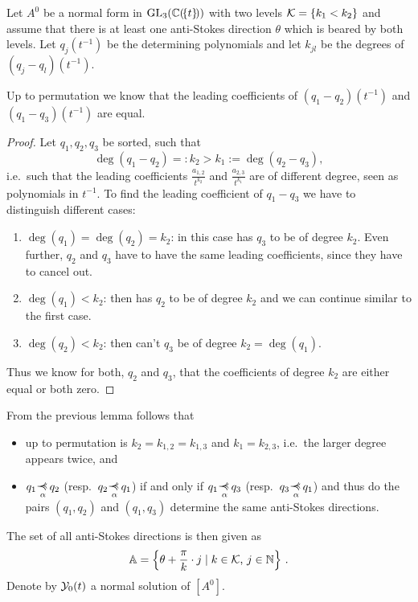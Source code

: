 Let $A^0$ be a normal form in $\operatorname{GL}_3(\mathbb{C}(\!\{t\}\!))$ with two levels
$\mathcal{K}=\{k_1<k_2\}$ and assume that there is at least one anti-Stokes
direction $\theta$ which is beared by both levels.
Let $q_j(t^{-1})$ be the determining polynomials and let $k_{jl}$ be the
degrees of $(q_j-q_l)(t^{-1})$.
\begin{lem}\label{lem:simpleLemmaOnStructure}
  Up to permutation we know that the leading coefficients of
  $(q_1-q_2)(t^{-1})$ and $(q_1-q_3)(t^{-1})$ are equal.
\end{lem}
\begin{proof}
  Let $q_1,q_2,q_3$ be sorted, such that
  \[
    \deg(q_1-q_2) =: k_2 > k_1 := \deg(q_2-q_3),
  \]
  i.e.\ such that the leading coefficients $\frac{a_{1,2}}{t^{k_2}}$ and
  $\frac{a_{2,3}}{t^{k_1}}$ are of different degree, seen as polynomials in
  $t^{-1}$. To find the leading coefficient of $q_1-q_3$ we have to
  distinguish different cases:
  \begin{enumerate}
  \item $\deg(q_1)=\deg(q_2)=k_2$: in this case has
    $q_3$ to be of degree $k_2$.
    Even further, $q_2$ and $q_3$ have to have the same leading coefficients,
    since they have to cancel out.
  \item $\deg(q_1)<k_2$: then has $q_2$ to be of
    degree $k_2$ and we can continue similar to the first case.
  \item $\deg(q_2)<k_2$: then can't $q_3$ be of
    degree $k_2=\deg(q_1)$.
  \end{enumerate}
  Thus we know for both, $q_2$ and $q_3$, that the coefficients of degree $k_2$
  are either equal or both zero.
\end{proof}
From the previous lemma follows that
\begin{itemize}
\item up to permutation is $k_2=k_{1,2}=k_{1,3}$ and $k_1=k_{2,3}$, i.e.\ the
  larger degree appears twice, and
\item $q_1\myrel{\alpha}q_2$ (resp.~$q_2\myrel{\alpha}q_1$) if and only if
  $q_1\myrel{\alpha}q_3$ (resp.~$q_3\myrel{\alpha}q_1$) and thus do the pairs
  $(q_1,q_2)$ and $(q_1,q_3)$ determine the same anti-Stokes directions.
\end{itemize}
The set of all anti-Stokes directions is then given as
\[
  \mathbb{A}=\left\{\theta+\frac{\pi}{k}\cdot j\mid k\in\mathcal{K}\text{, }j\in\mathbb{N}\right\} \,.
\]
Denote by $\mathcal{Y}_0(t)$ a normal solution of $[A^0]$.

